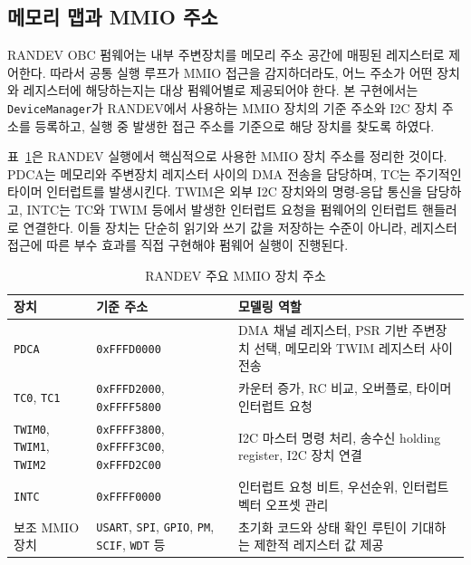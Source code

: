 \documentclass[master,korean,final]{kaist-ucs}
\begin{document}
\subsection{메모리 맵과 MMIO 주소}

RANDEV OBC 펌웨어는 내부 주변장치를 메모리 주소 공간에 매핑된 레지스터로 제어한다. 따라서 공통 실행 루프가 MMIO 접근을 감지하더라도, 어느 주소가 어떤 장치와 레지스터에 해당하는지는 대상 펌웨어별로 제공되어야 한다. 본 구현에서는 \texttt{DeviceManager}가 RANDEV에서 사용하는 MMIO 장치의 기준 주소와 I2C 장치 주소를 등록하고, 실행 중 발생한 접근 주소를 기준으로 해당 장치를 찾도록 하였다.

표~\ref{tab:randev-mmio-map}은 RANDEV 실행에서 핵심적으로 사용한 MMIO 장치 주소를 정리한 것이다. PDCA는 메모리와 주변장치 레지스터 사이의 DMA 전송을 담당하며, TC는 주기적인 타이머 인터럽트를 발생시킨다. TWIM은 외부 I2C 장치와의 명령-응답 통신을 담당하고, INTC는 TC와 TWIM 등에서 발생한 인터럽트 요청을 펌웨어의 인터럽트 핸들러로 연결한다. 이들 장치는 단순히 읽기와 쓰기 값을 저장하는 수준이 아니라, 레지스터 접근에 따른 부수 효과를 직접 구현해야 펌웨어 실행이 진행된다.

\begin{table}[t]
\caption{RANDEV 주요 MMIO 장치 주소}
\label{tab:randev-mmio-map}
\begin{center}
\begin{small}
\begin{tabular}{p{2.5cm}p{3.3cm}p{6.2cm}}
\hline\hline
장치 & 기준 주소 & 모델링 역할 \\
\hline
\texttt{PDCA} & \texttt{0xFFFD0000} & DMA 채널 레지스터, PSR 기반 주변장치 선택, 메모리와 TWIM 레지스터 사이 전송 \\
\texttt{TC0}, \texttt{TC1} & \texttt{0xFFFD2000}, \texttt{0xFFFF5800} & 카운터 증가, RC 비교, 오버플로, 타이머 인터럽트 요청 \\
\texttt{TWIM0}, \texttt{TWIM1}, \texttt{TWIM2} & \texttt{0xFFFF3800}, \texttt{0xFFFF3C00}, \texttt{0xFFFD2C00} & I2C 마스터 명령 처리, 송수신 holding register, I2C 장치 연결 \\
\texttt{INTC} & \texttt{0xFFFF0000} & 인터럽트 요청 비트, 우선순위, 인터럽트 벡터 오프셋 관리 \\
보조 MMIO 장치 & \texttt{USART}, \texttt{SPI}, \texttt{GPIO}, \texttt{PM}, \texttt{SCIF}, \texttt{WDT} 등 & 초기화 코드와 상태 확인 루틴이 기대하는 제한적 레지스터 값 제공 \\
\hline\hline
\end{tabular}
\end{small}
\end{center}
\end{table}
\end{document}
